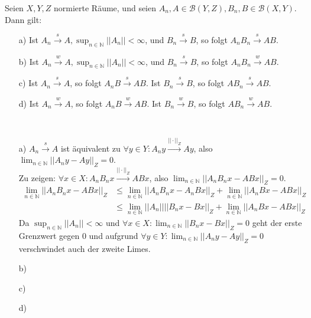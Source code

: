 \begin{exercise}
Seien $X,Y,Z$ normierte Räume, und seien $A_n,A \in \mathcal{B}(Y,Z),B_n,B\in \mathcal{B}(X,Y)$.
Dann gilt:
\begin{itemize}
  \item [a)] Ist $A_n \stackrel{s}{\rightarrow} A, \sup_{n\in\mathbb{N}} ||A_n|| < \infty$,
  und $B_n \stackrel{s}{\rightarrow} B$, so folgt $A_nB_n \stackrel{s}{\rightarrow} AB$.
  \item [b)] Ist $A_n \stackrel{w}{\rightarrow} A, \sup_{n\in\mathbb{N}} ||A_n|| < \infty$,
  und $B_n \stackrel{s}{\rightarrow} B$, so folgt $A_nB_n \stackrel{w}{\rightarrow} AB$.
  \item [c)] Ist $A_n \stackrel{s}{\rightarrow} A$, so folgt $A_nB \stackrel{s}{\rightarrow} AB$.
  Ist $B_n \stackrel{s}{\rightarrow} B$, so folgt $AB_n \stackrel{s}{\rightarrow} AB$.
  \item [d)] Ist $A_n \stackrel{w}{\rightarrow} A$, so folgt $A_nB \stackrel{w}{\rightarrow} AB$.
  Ist $B_n \stackrel{w}{\rightarrow} B$, so folgt $AB_n \stackrel{w}{\rightarrow} AB$.
\end{itemize}
\end{exercise}

\begin{solution}
\leavevmode \\
\begin{itemize}
  \item [a)] $A_n \stackrel{s}{\rightarrow} A$ ist äquivalent zu
  $\forall y \in Y: A_ny \stackrel{||\cdot||_Z}{\rightarrow} Ay$,
  also $\lim_{n \in \mathbb{N}}||A_ny - Ay||_Z = 0$.\\
  Zu zeigen: $\forall x \in X: A_nB_nx \stackrel{||\cdot||_Z}{\rightarrow} ABx$,
  also $\lim_{n \in \mathbb{N}}||A_nB_nx - ABx||_Z = 0$.
  \begin{align*}
    \lim_{n \in \mathbb{N}}||A_nB_nx - ABx||_Z &\leq
    \lim_{n \in \mathbb{N}}||A_nB_nx - A_nBx||_Z + \lim_{n \in \mathbb{N}}||A_nBx - ABx||_Z \\
    &\leq \lim_{n \in \mathbb{N}}||A_n|| ||B_nx - Bx||_Z + \lim_{n \in \mathbb{N}}||A_nBx - ABx||_Z
  \end{align*}
  Da $\sup_{n\in\mathbb{N}} ||A_n|| < \infty$ und $\forall x \in X:
  \lim_{n \in \mathbb{N}}||B_nx - Bx||_Z = 0$ geht der erste Grenzwert gegen $0$
  und aufgrund $\forall y \in Y: \lim_{n \in \mathbb{N}}||A_ny - Ay||_Z = 0$
  verschwindet auch der zweite Limes.
  \item [b)]
  \item [c)]
  \item [d)]
\end{itemize}


\end{solution}
